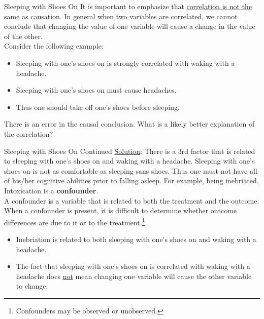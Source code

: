 \documentclass[pdf]{beamer}
\newcommand{\empr}[1]{{\color{franklinblue}\textbf{#1}}}
\theoremstyle{remark}
\theoremstyle{definition}
\begin{document}
\begin{frame}[t]{Sleeping with Shoes On}
It is important to emphasize that \underline{correlation is {\color{red} not} the same as} \underline{causation}. In general when two variables are correlated, we cannot conclude that changing the value of one variable will cause a change in the value of the other.\\
\vspace{1.5ex}
Consider the following example:\\
\small
\vspace{-0.0ex}
\begin{itemize}
\item Sleeping with one's shoes on is strongly correlated with waking with a headache. 
\item Sleeping with one's shoes on must cause headaches. 
\item Thus one should take off one's shoes before sleeping.
\end{itemize}
\normalsize
\vspace{-1.0ex}
 There is an error in the causal conclusion. What is a likely better explanation of the correlation?  
\end{frame}

\begin{frame}[t]{Sleeping with Shoes On Continued}
\underline{Solution}: There is a 3rd factor that is related to sleeping with one's shoes on and waking with a headache. Sleeping with one's shoes on is not as comfortable as sleeping sans shoes.  Thus one must not have all of his/her cognitive abilities prior to falling asleep.  For example, being inebriated. Intoxication is a \empr{confounder}. \\
\vspace{1.5ex}
A confounder is a variable that is related to both the treatment and the outcome. When a confounder is present, it is difficult to determine whether outcome differences are due to it or to the treatment.\footnote{Confounders may be observed or unobserved.} \\
\vspace{0.5ex}
\small
\begin{itemize}
\item Inebriation is related to both sleeping with one's shoes on and waking with a headache. 
\item The fact that sleeping with one's shoes on is correlated with waking with a headache does \underline{not} mean changing one variable will cause the other variable to change.  
\end{itemize}
\end{frame}
\end{document}
